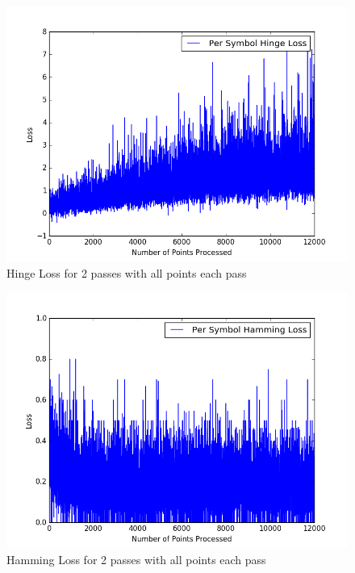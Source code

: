 \documentclass[twoside,11pt]{article}
\theoremstyle{definition}
\begin{document}
\begin{figure}[h]
\centering
\includegraphics[width=5in]{hingeLoss2.png}
\caption{Hinge Loss for 2 passes with all points each pass}
\end{figure}

\begin{figure}[h]
\centering
\includegraphics[width=5in]{hammingLoss2.png}
\caption{Hamming Loss for 2 passes with all points each pass}
\end{figure}
\end{document}
